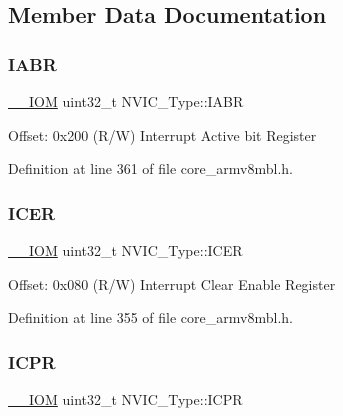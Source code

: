 \subsection{Member Data Documentation}
\mbox{\label{struct_n_v_i_c___type_a6e42ca3d9a1e12e75463cef68785d533}} 
\subsubsection{\texorpdfstring{I\+A\+BR}{IABR}}
{\footnotesize\ttfamily \hyperlink{core__sc300_8h_ab6caba5853a60a17e8e04499b52bf691}{\+\_\+\+\_\+\+I\+OM} uint32\+\_\+t N\+V\+I\+C\+\_\+\+Type\+::\+I\+A\+BR}

Offset\+: 0x200 (R/W) Interrupt Active bit Register 

Definition at line 361 of file core\+\_\+armv8mbl.\+h.

\mbox{\label{struct_n_v_i_c___type_aed882e10ea8ee6a915007af71643d7da}} 
\subsubsection{\texorpdfstring{I\+C\+ER}{ICER}}
{\footnotesize\ttfamily \hyperlink{core__sc300_8h_ab6caba5853a60a17e8e04499b52bf691}{\+\_\+\+\_\+\+I\+OM} uint32\+\_\+t N\+V\+I\+C\+\_\+\+Type\+::\+I\+C\+ER}

Offset\+: 0x080 (R/W) Interrupt Clear Enable Register 

Definition at line 355 of file core\+\_\+armv8mbl.\+h.

\mbox{\label{struct_n_v_i_c___type_aa056e3f59e88845ee47db4a43635b3a2}} 
\subsubsection{\texorpdfstring{I\+C\+PR}{ICPR}}
{\footnotesize\ttfamily \hyperlink{core__sc300_8h_ab6caba5853a60a17e8e04499b52bf691}{\+\_\+\+\_\+\+I\+OM} uint32\+\_\+t N\+V\+I\+C\+\_\+\+Type\+::\+I\+C\+PR}

